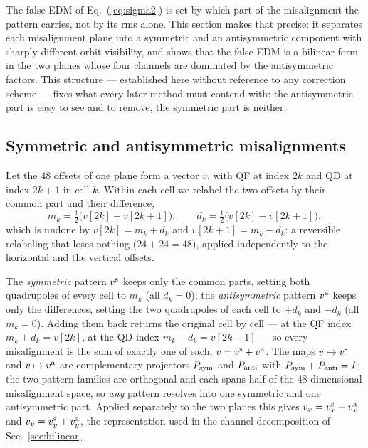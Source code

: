 \documentclass[aps,prab,reprint,superscriptaddress,nofootinbib]{revtex4-2}
\begin{document}
The false EDM of Eq.~(\ref{eq:sigma2}) is set by which part of the misalignment
the pattern carries, not by its rms alone.  This section makes that precise: it
separates each misalignment plane into a symmetric and an antisymmetric
component with sharply different orbit visibility, and shows that the false EDM
is a bilinear form in the two planes whose four channels are dominated by the
antisymmetric factors.  This structure --- established here without reference to
any correction scheme --- fixes what every later method must contend with: the
antisymmetric part is easy to see and to remove, the symmetric part is
neither.

\subsection{Symmetric and antisymmetric misalignments}
\label{sec:symanti}

Let the 48 offsets of one plane form a vector $v$, with QF at index $2k$ and
QD at index $2k{+}1$ in cell $k$.  Within each cell we relabel the two offsets
by their common part and their difference,
\begin{equation}
  m_k = \tfrac12\big(v[2k]+v[2k{+}1]\big), \qquad
  d_k = \tfrac12\big(v[2k]-v[2k{+}1]\big),
  \label{eq:projectors}
\end{equation}
which is undone by $v[2k] = m_k + d_k$ and $v[2k{+}1] = m_k - d_k$: a reversible
relabeling that loses nothing ($24 + 24 = 48$), applied independently to the
horizontal and the vertical offsets.

The \emph{symmetric} pattern $v^{\rm s}$ keeps only the common parts, setting
both quadrupoles of every cell to $m_k$ (all $d_k = 0$); the
\emph{antisymmetric} pattern $v^{\rm a}$ keeps only the differences, setting the
two quadrupoles of each cell to $+d_k$ and $-d_k$ (all $m_k = 0$).  Adding them
back returns the original cell by cell --- at the QF index $m_k + d_k = v[2k]$,
at the QD index $m_k - d_k = v[2k{+}1]$ --- so every misalignment is the sum of
exactly one of each, $v = v^{\rm s} + v^{\rm a}$.  The maps $v \mapsto v^{\rm s}$
and $v \mapsto v^{\rm a}$ are complementary projectors $P_{\rm sym}$ and
$P_{\rm anti}$ with $P_{\rm sym}+P_{\rm anti}=I$; the two pattern families are
orthogonal and each spans half of the $48$-dimensional misalignment space, so
\emph{any} pattern resolves into one symmetric and one antisymmetric part.
Applied separately to the two planes this gives
$v_x = v_x^{\rm s} + v_x^{\rm a}$ and $v_y = v_y^{\rm s} + v_y^{\rm a}$, the
representation used in the channel decomposition of Sec.~\ref{sec:bilinear}.
\end{document}
